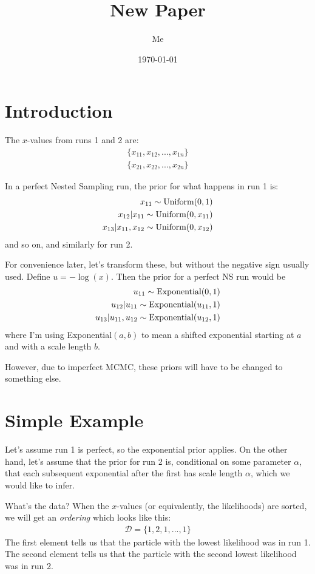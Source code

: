 \documentclass[a4paper, 11pt]{article}
\title{New Paper}
\author{Me}
\date{\today}
\begin{document}
\maketitle


\section{Introduction}
The $x$-values from runs 1 and 2 are:
\begin{eqnarray}
\{x_{11}, x_{12}, ..., x_{1n}\}\\
\{x_{21}, x_{22}, ..., x_{2n}\}
\end{eqnarray}

In a perfect Nested Sampling run, the prior for what happens in run 1 is:
\begin{eqnarray}
x_{11} \sim \textnormal{Uniform}(0, 1)\\
x_{12} | x_{11} \sim \textnormal{Uniform}(0, x_{11})\\
x_{13} | x_{11}, x_{12} \sim \textnormal{Uniform}(0, x_{12})
\end{eqnarray}
and so on, and similarly for run 2.

For convenience later, let's transform these, but without the negative sign
usually used. Define $u=-\log(x)$. Then the prior for a perfect NS run would be
\begin{eqnarray}
u_{11} \sim \textnormal{Exponential}(0, 1)\\
u_{12} | u_{11} \sim \textnormal{Exponential}(u_{11}, 1)\\
u_{13} | u_{11}, u_{12} \sim \textnormal{Exponential}(u_{12}, 1)
\end{eqnarray}
where I'm using Exponential$(a, b)$ to mean a shifted exponential starting
at $a$ and with a scale length $b$.

However, due to imperfect MCMC, these priors will have to be changed to
something else.

\section{Simple Example}
Let's assume run 1 is perfect, so the exponential prior applies. On the other
hand, let's assume that the prior for run 2 is, conditional on some parameter
$\alpha$, that each subsequent exponential after the first has scale
length $\alpha$, which we would like to infer.

What's the data? When the $x$-values (or equivalently, the likelihoods) are
sorted, we will get an {\it ordering} which looks like this:
\begin{eqnarray}
\mathcal{D} = \{1, 2, 1, ..., 1\}
\end{eqnarray}
The first element tells us that the particle with the lowest likelihood was
in run 1. The second element tells us that the particle with the second lowest
likelihood was in run 2.
\end{document}
